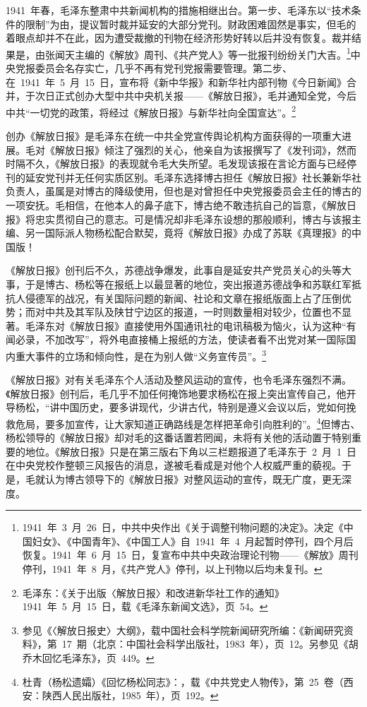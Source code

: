 1941~年春，毛泽东整肃中共新闻机构的措施相继出台。第一步、毛泽东以“技术条件的限制”为由，提议暂时裁并延安的大部分党刊。财政困难固然是事实，但毛的着眼点却并不在此，因为遭受裁撤的刊物在经济形势好转以后并没有恢复。裁并结果是，由张闻天主编的《解放》周刊、《共产党人》等一批报刊纷纷关门大吉。\footnote{1941~年~3~月~26~日，中共中央作出《关于调整刊物问题的决定》。决定《中国妇女》、《中国青年》、《中国工人》自~1941~年~4~月起暂时停刊，四个月后恢复。1941~年~6~月~15~日，复宣布中共中央政治理论刊物——《解放》周刊停刊，1941~年~8~月，《共产党人》停刊，以上刊物以后均未复刊。}中央党报委员会名存实亡，几乎不再有党刊党报需要管理。第二步、在~1941~年~5~月~15~日，宣布将《新中华报》和新华社内部刊物《今日新闻》合并，于次日正式创办大型中共中央机关报——《解放日报》，毛并通知全党，今后中共“一切党的政策，将经过《解放日报》与新华社向全国宣达”。\footnote{毛泽东：《关于出版〈解放日报〉和改进新华社工作的通知》1941~年~5~月~15~日，载《毛泽东新闻文选》，页~54。}

创办《解放日报》是毛泽东在统一中共全党宣传舆论机构方面获得的一项重大进展。毛对《解放日报》倾注了强烈的关心，他亲自为该报撰写了《发刊词》，然而时隔不久，《解放日报》的表现就令毛大失所望。毛发现该报在言论方面与已经停刊的延安党刊并无任何实质区别。毛泽东选择博古担任《解放日报》社长兼新华社负责人，虽属是对博古的降级使用，但也是对曾担任中央党报委员会主任的博古的一项安抚。毛相信，在他本人的鼻子底下，博古绝不敢违抗自己的旨意，《解放日报》将忠实贯彻自己的意志。可是情况却非毛泽东设想的那般顺利，博古与该报主编、另一国际派人物杨松配合默契，竟将《解放日报》办成了苏联《真理报》的中国版！

《解放日报》创刊后不久，苏德战争爆发，此事自是延安共产党员关心的头等大事，于是博古、杨松等在报纸上以最显著的地位，突出报道苏德战争和苏联红军抵抗人侵德军的战况，有关国际问题的新闻、社论和文章在报纸版面上占了压倒优势；而对中共及其军队及陕甘宁边区的报道，一时则数量相对较少，位置也不显著。毛泽东对《解放日报》直接使用外国通讯社的电讯稿极为恼火，认为这种“有闻必录，不加改写”，将外电直接桶上报纸的方法，使读者看不出党对某一国际国内重大事件的立场和倾向性，是在为别人做“义务宣传员”。\footnote{参见《〈解放日报史〉大纲》，载中国社会科学院新闻研究所编：《新闻研究资料》，第~17~期（北京：中国社会科学出版社，1983~年），页~12。另参见《胡乔木回忆毛泽东》，页~449。}

《解放日报》对有关毛泽东个人活动及整风运动的宣传，也令毛泽东强烈不满。《解放日报》创刊后，毛几乎不加任何掩饰地要求杨松在报上突出宣传自己，他开导杨松，“讲中国历史，要多讲现代，少讲古代，特别是遵义会议以后，党如何挽救危局，要多加宣传，让大家知道正确路线是怎样把革命引向胜利的”。\footnote{杜青（杨松遗孀）《回忆杨松同志》：，载《中共党史人物传》，第~25~卷（西安：陕西人民出版社，1985~年），页~192。}但博古、杨松领导的《解放日报》却对毛的这番话置若罔闻，未将有关他的活动置于特别重要的地位。《解放日报》只是在第三版右下角以三栏题报道了毛泽东于~2~月~1~日在中央党校作整顿三风报告的消息，遂被毛看成是对他个人权威严重的藐视。于是，毛就认为博古领导下的《解放日报》对整风运动的宣传，既无广度，更无深度。

